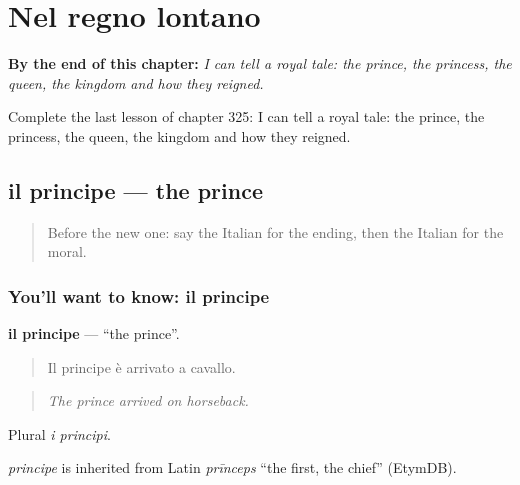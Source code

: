 
\chapter{Nel regno lontano}
\label{ch:it-nel-regno-lontano}

\begin{chapteropening}
\textbf{By the end of this chapter:} \emph{I can tell a royal tale: the prince, the princess, the queen, the kingdom and how they reigned.}

Complete the last lesson of chapter 325: I can tell a royal tale: the prince, the princess, the queen, the kingdom and how they reigned.
\end{chapteropening}

\section[il principe]{il principe — the prince}

\label{lesson:IT-C325-principe}



\begin{quote}
Before the new one: say the Italian for the ending, then the Italian for the moral.
\end{quote}

\subsection*{You'll want to know: il principe}
\textbf{il principe} — \textquotedblleft{}the prince\textquotedblright{}.

\begin{quote}
Il principe è arrivato a cavallo.
\end{quote}

\begin{quote}
\emph{The prince arrived on horseback.}
\end{quote}

Plural \emph{i principi}.

\begin{cousinweb}
\emph{principe} is inherited from Latin \emph{prīnceps} \textquotedblleft{}the first, the chief\textquotedblright{} (EtymDB).
\end{cousinweb}

